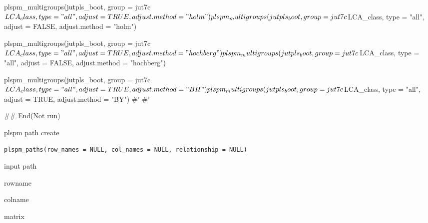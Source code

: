 \documentclass[a4paper]{book}
\begin{document}
\begin{Examples}
\begin{ExampleCode}
plspm_multigroups(jutpls_boot, group = jut7c$LCA_class,
                  type = "all", adjust = TRUE, adjust.method = "holm")

plspm_multigroups(jutpls_boot, group = jut7c$LCA_class,
                  type = "all", adjust = FALSE, adjust.method = "holm")

plspm_multigroups(jutpls_boot, group = jut7c$LCA_class,
                  type = "all", adjust = TRUE, adjust.method = "hochberg")
plspm_multigroups(jutpls_boot, group = jut7c$LCA_class,
                  type = "all", adjust = FALSE, adjust.method = "hochberg")

plspm_multigroups(jutpls_boot, group = jut7c$LCA_class,
                  type = "all", adjust = TRUE, adjust.method = "BH")

plspm_multigroups(jutpls_boot, group = jut7c$LCA_class,
                  type = "all", adjust = TRUE, adjust.method = "BY")
#'
#'

## End(Not run)
\end{ExampleCode}
\end{Examples}
%
\begin{Description}
plspm path create
\end{Description}
%
\begin{Usage}
\begin{verbatim}
plspm_paths(row_names = NULL, col_names = NULL, relationship = NULL)
\end{verbatim}
\end{Usage}
%
\begin{Arguments}
\begin{ldescription}
\item[\code{relationship}] input path

\item[\code{rownames}] rowname

\item[\code{colnames}] colname
\end{ldescription}
\end{Arguments}
%
\begin{Value}
matrix
\end{Value}
%
\end{document}
